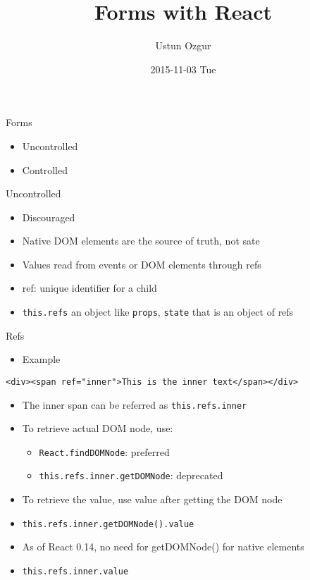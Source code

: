 \documentclass[presentation]{beamer}
\author{Ustun Ozgur}
\date{2015-11-03 Tue}
\title{Forms with React}
\begin{document}
\maketitle

\begin{frame}[label={sec:orgheadline1}]{Forms}
\begin{itemize}
\item Uncontrolled
\item Controlled
\end{itemize}
\end{frame}

\begin{frame}[fragile,label={sec:orgheadline2}]{Uncontrolled}
 \begin{itemize}
\item Discouraged
\item Native DOM elements are the source of truth, not sate
\item Values read from events or DOM elements through refs
\item ref: unique identifier for a child
\item \texttt{this.refs} an object like \texttt{props}, \texttt{state} that is an object of refs
\end{itemize}
\end{frame}

\begin{frame}[fragile,label={sec:orgheadline3}]{Refs}
 \begin{itemize}
\item Example
\end{itemize}
\begin{verbatim}
<div><span ref="inner">This is the inner text</span></div>
\end{verbatim}

\begin{itemize}
\item The inner span can  be referred as \texttt{this.refs.inner}

\item To retrieve actual DOM node, use:
\begin{itemize}
\item \texttt{React.findDOMNode}: preferred
\item \texttt{this.refs.inner.getDOMNode}: deprecated
\end{itemize}

\item To retrieve the value, use value after getting the DOM node
\item \texttt{this.refs.inner.getDOMNode().value}

\item As of React 0.14, no need for getDOMNode() for native elements
\item \texttt{this.refs.inner.value}
\end{itemize}
\end{frame}
\end{document}
